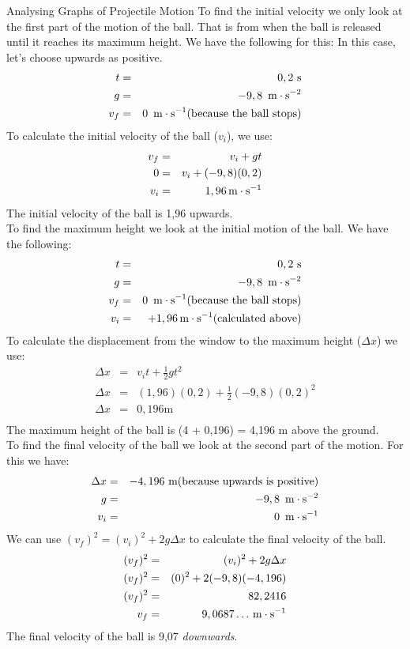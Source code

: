 \begin{wex}{Analysing Graphs of Projectile Motion}
{
To find the initial velocity we only look at the first part of the motion of the ball. That is from when the ball is released until it reaches its maximum height. We have the following for this: In this case, let's choose upwards as positive.
\begin{eqnarray*}
t &=& 0,2\text{ s}\\
g &=& -9,8~\,\mathrm{m \cdot s^{-2}}\\
v_f &=& 0~\,\mathrm{m \cdot s^{-1}} \text{(because~the~ball~stops)}
\end{eqnarray*}
To calculate the initial velocity of the ball ($v_i$), we use:
\begin{eqnarray*}
v_f &=& v_i + gt\\
0 &=& v_i + (-9,8)(0,2)\\
v_i &=& 1,96 \,\mathrm{m \cdot s^{-1}}
\end{eqnarray*}
The initial velocity of the ball is 1,96 \ms upwards.\\

To find the maximum height we look at the initial motion of the ball. We have the following:
\begin{eqnarray*}
t &=& 0,2~\text{s}\\
g &=& -9,8~\,\mathrm{m \cdot s^{-2}}\\
v_f &=& 0~\,\mathrm{m \cdot s^{-1}} \text{(because the ball stops)}\\
v_i &=& +1,96 \,\mathrm{m \cdot s^{-1}} \text{(calculated above)}
\end{eqnarray*}
To calculate the displacement from the window to the maximum height ($\Delta x$) we use:
\begin{eqnarray*}
\Delta x &=& v_it + \frac{1}{2}gt^2\\
\Delta x &=& (1,96)(0,2) + \frac{1}{2}(-9,8)(0,2)^2\\
\Delta x &=& 0,196 \text{m}\\
\end{eqnarray*}
The maximum height of the ball is (4 + 0,196) = 4,196 m above the ground.\\

To find the final velocity of the ball we look at the second part of the motion. For this we have:
\begin{eqnarray*}
\Delta x &=& -4,196~\text{m} \text{(because upwards is positive)}\\
g &=& -9,8~\,\mathrm{m \cdot s^{-2}}\\
v_i &=& 0~\,\mathrm{m \cdot s^{-1}}
\end{eqnarray*}
We can use $(v_f)^2 = (v_i)^2 + 2g\Delta x$ to calculate the final velocity of the ball.
\begin{eqnarray*}
(v_f)^2 &=& (v_i)^2 + 2g\Delta x\\
(v_f)^2 &=& (0)^2 + 2(-9,8)(-4,196)\\
(v_f)^2 &=& 82,2416\\
v_f &=& 9,0687\ldots \,\mathrm{m \cdot s^{-1}}\\
\end{eqnarray*}
The final velocity of the ball is 9,07 \ms \textit{downwards}.
}
\end{wex}

